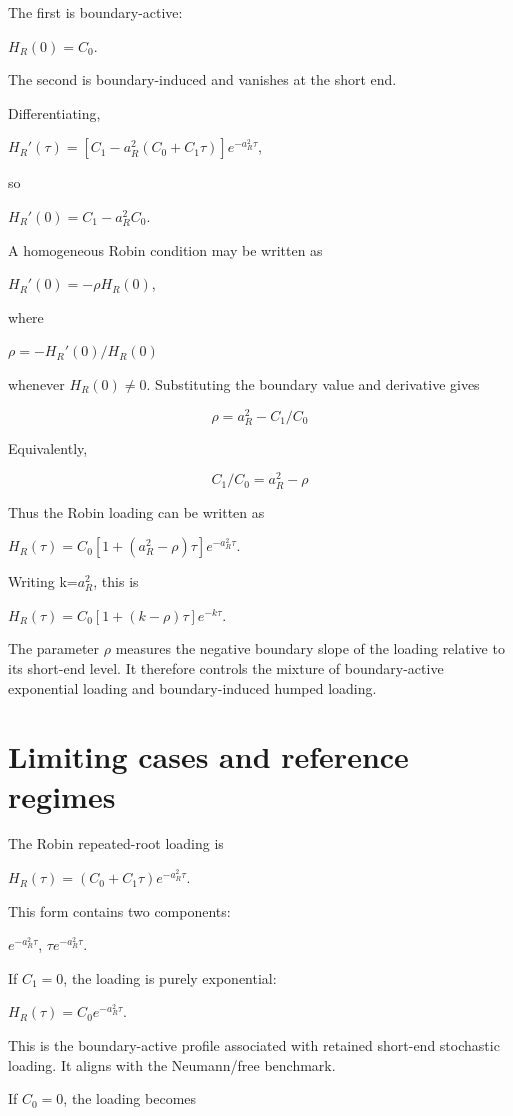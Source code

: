 \documentclass[11pt,oneside]{book}
\begin{document}
The first is boundary-active:

$H_R(0)=C_0$.

The second is boundary-induced and vanishes at the short end.

Differentiating,

$H_R'(\tau)=[C_1-a_R^2(C_0+C_1\tau)]e^{-a_R^2\tau}$,

so

$H_R'(0)=C_1-a_R^2C_0$.

A homogeneous Robin condition may be written as

$H_R'(0)=-\rho H_R(0)$,

where

$\rho=-H_R'(0)/H_R(0)$

whenever $H_R(0)\neq0$. Substituting the boundary value and derivative gives

\[
\rho = a_R^2 - C_1/C_0
\]

Equivalently,

\[
C_1/C_0 = a_R^2 - \rho
\]

Thus the Robin loading can be written as

$H_R(\tau)=C_0[1+(a_R^2-\rho)\tau]e^{-a_R^2\tau}$.

Writing k=$a_R^2$, this is

$H_R(\tau)=C_0[1+(k-\rho)\tau]e^{-k\tau}$.

The parameter $\rho$ measures the negative boundary slope of the loading
relative to its short-end level. It therefore controls the mixture of
boundary-active exponential loading and boundary-induced humped loading.

\section{Limiting cases and reference
regimes}\label{limiting-cases-and-reference-regimes}

The Robin repeated-root loading is

$H_R(\tau)=(C_0+C_1\tau)e^{-a_R^2\tau}$.

This form contains two components:

$e^{-a_R^2\tau}$, $\tau e^{-a_R^2\tau}$.

If $C_1=0$, the loading is purely exponential:

$H_R(\tau)=C_0e^{-a_R^2\tau}$.

This is the boundary-active profile associated with retained short-end
stochastic loading. It aligns with the Neumann/free benchmark.

If $C_0=0$, the loading becomes
\end{document}
